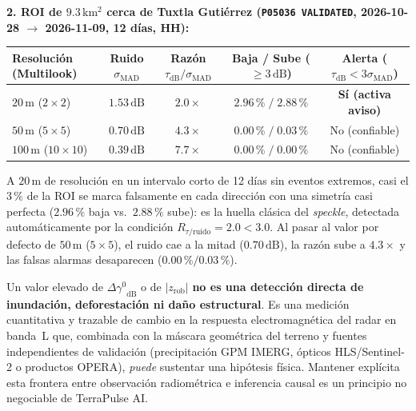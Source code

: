\documentclass[11pt,a4paper]{article}
\newcommand{\unit}[1]{\mathrm{#1}}
\newcommand{\gz}{\ensuremath{\gamma^{0}}}
\begin{document}
\begin{ejemplo}
\noindent\textbf{2. ROI de $9.3\,\unit{km^2}$ cerca de Tuxtla Gutiérrez (\texttt{P05036 VALIDATED}, 2026-10-28 $\to$ 2026-11-09, 12 días, HH):}
\begin{center}
\small
\begin{tabular}{lcccc}
\toprule
\textbf{Resolución (Multilook)} & \textbf{Ruido $\sigma_{\mathrm{MAD}}$} & \textbf{Razón $\tau_{\mathrm{dB}}/\sigma_{\mathrm{MAD}}$} & \textbf{Baja / Sube ($\ge 3\,\unit{dB}$)} & \textbf{Alerta ($\tau_{\mathrm{dB}} < 3\sigma_{\mathrm{MAD}}$)} \\
\midrule
$20\,\unit{m}$ ($2\times 2$)   & $1.53\,\unit{dB}$ & $2.0\times$ & $2.96\,\text{\%} \;/\; 2.88\,\text{\%}$ & \textbf{Sí (activa aviso)} \\
$50\,\unit{m}$ ($5\times 5$)   & $0.70\,\unit{dB}$ & $4.3\times$ & $0.00\,\text{\%} \;/\; 0.03\,\text{\%}$ & No (confiable) \\
$100\,\unit{m}$ ($10\times 10$) & $0.39\,\unit{dB}$ & $7.7\times$ & $0.00\,\text{\%} \;/\; 0.00\,\text{\%}$ & No (confiable) \\
\bottomrule
\end{tabular}
\end{center}
A $20\,\unit{m}$ de resolución en un intervalo corto de 12 días sin eventos extremos, casi el $3\,\text{\%}$ de la ROI
se marca falsamente en cada dirección con una simetría casi perfecta ($2.96\,\text{\%}$ baja vs.\ $2.88\,\text{\%}$ sube): es
la huella clásica del \emph{speckle}, detectada automáticamente por la condición $R_{\tau/\text{ruido}} = 2.0 < 3.0$.
Al pasar al valor por defecto de $50\,\unit{m}$ ($5\times 5$), el ruido cae a la mitad ($0.70\,\unit{dB}$), la
razón sube a $4.3\times$ y las falsas alarmas desaparecen ($0.00\,\text{\%} / 0.03\,\text{\%}$).
\end{ejemplo}

\begin{atencion}
Un valor elevado de $\Delta\gz_{\mathrm{dB}}$ o de $|z_{\mathrm{rob}}|$ \textbf{no es una detección directa de
inundación, deforestación ni daño estructural}. Es una medición cuantitativa y trazable de cambio en la
respuesta electromagnética del radar en banda~L que, combinada con la máscara geométrica del terreno y fuentes
independientes de validación (precipitación GPM IMERG, ópticos HLS/Sentinel-2 o productos OPERA), \emph{puede}
sustentar una hipótesis física. Mantener explícita esta frontera entre observación radiométrica e inferencia
causal es un principio no negociable de TerraPulse AI.
\end{atencion}
\end{document}
